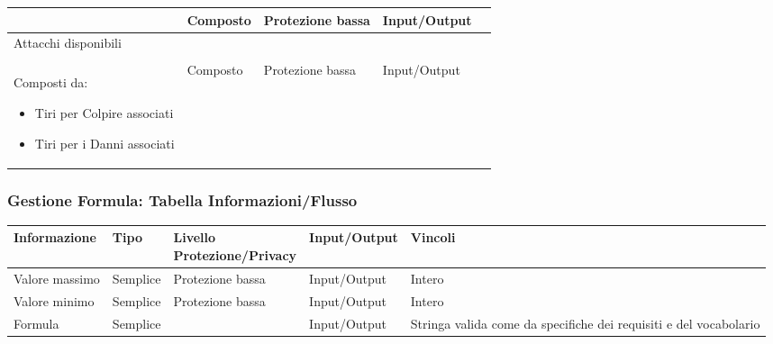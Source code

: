 \documentclass[a4paper, 11pt]{article}
\let\newline\\
\begin{document}
\begin{adjustwidth}{-1.5cm}{-1.5cm}
\begin{center}
\begin{tabular}{|p{3.5cm}|p{1.5cm}|p{3.5cm}|p{2.5cm}|p{4cm}|}
\begin{itemize}
        \end{itemize}& Composto & Protezione bassa & Input/Output & \\
        \hline
        Attacchi disponibili \newline \newline Composti da: \begin{itemize}
            \item Tiri per Colpire associati
            \item Tiri per i Danni associati
        \end{itemize} & Composto & Protezione bassa & Input/Output &  \\
        \hline
    \end{tabular}
\end{center}
\end{adjustwidth}


\vspace{2em}

\subsubsection*{Gestione Formula: Tabella Informazioni/Flusso}
\begin{adjustwidth}{-1.5cm}{-1.5cm}
\begin{center}
    \begin{tabular}{|p{3cm}|p{1.5cm}|p{3.5cm}|p{2.5cm}|p{4cm}|}
        \hline
        \textbf{Informazione} & \textbf{Tipo} & \textbf{Livello \newline Protezione/Privacy} & \textbf{Input/Output}&\textbf{Vincoli}\\
        \hline
        Valore massimo & Semplice & Protezione bassa & Input/Output & Intero \\
        \hline
        Valore minimo & Semplice & Protezione bassa & Input/Output & Intero \\
        \hline
        Formula & Semplice &  & Input/Output & Stringa valida come da specifiche dei requisiti e del vocabolario \\
        \hline
    \end{tabular}
\end{center}
\end{adjustwidth}

\vspace{2em}
\end{document}
